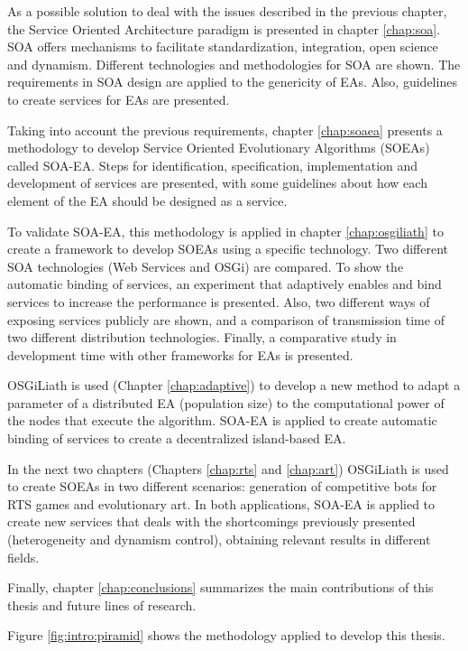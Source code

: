  As a possible solution to deal with the issues described in the previous chapter, the Service Oriented Architecture paradigm is presented in chapter \ref{chap:soa}. SOA  offers mechanisms to facilitate standardization, integration, open science and dynamism. Different technologies and methodologies for SOA are shown. The requirements in SOA design are applied to the genericity of EAs. Also, guidelines to create services for EAs are presented.

Taking into account the previous requirements, chapter \ref{chap:soaea} presents a methodology to develop Service Oriented Evolutionary Algorithms (SOEAs) called SOA-EA. Steps for identification, specification, implementation and development of services are presented, with some guidelines about how each element of the EA should be designed as a service.

To validate SOA-EA, this methodology is applied in chapter \ref{chap:osgiliath} to create a framework to develop SOEAs using a specific technology. Two different SOA technologies (Web Services and OSGi) are compared. To show the automatic binding of services, an experiment that adaptively enables and bind services to increase the performance is presented. Also, two different ways of exposing services publicly are shown, and a comparison of transmission time of two different distribution technologies. Finally, a comparative study in development time with other frameworks for EAs is presented.

OSGiLiath is used (Chapter \ref{chap:adaptive}) to develop a new method to adapt a parameter of a distributed EA (population size) to the computational power of the nodes that execute the algorithm. SOA-EA is applied to create automatic binding of services to create a decentralized island-based EA.

In the next two chapters (Chapters \ref{chap:rts} and \ref{chap:art}) OSGiLiath is used to create SOEAs in two different scenarios: generation of competitive bots for RTS games and evolutionary art. In both applications, SOA-EA is applied to create new services that deals with the shortcomings previously presented (heterogeneity and dynamism control), obtaining relevant results in different fields.

Finally, chapter \ref{chap:conclusions} summarizes the main contributions of this thesis and future lines of research.

Figure \ref{fig:intro:piramid} shows the methodology applied to develop this thesis.

